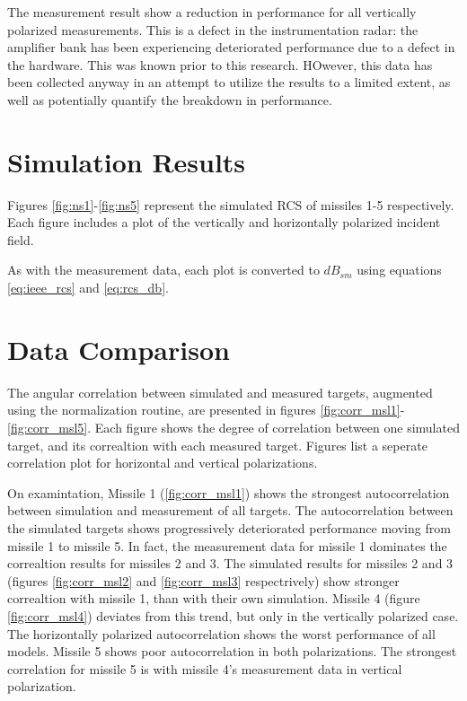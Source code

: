 	The measurement result show a reduction in performance for all vertically polarized measurements. This is a defect in the instrumentation radar:  the amplifier bank has been experiencing deteriorated performance due to a defect in the hardware. This was known prior to  this research. HOwever, this data has been collected anyway in an attempt to utilize the results to a limited extent, as well as potentially quantify the breakdown in performance.

\section{Simulation Results}
\label{sec:sim_res}

    Figures \ref{fig:ns1}-\ref{fig:ns5} represent the simulated RCS of missiles 1-5 respectively. Each figure includes a plot of the vertically and horizontally polarized incident field.

		As with the measurement data, each plot is converted to $dB_{sm}$ using equations \ref{eq:ieee_rcs} and \ref{eq:rcs_db}.

\section{Data Comparison}
\label{sec:data_comparison}

	The angular correlation between simulated and measured targets, augmented using the normalization routine, are presented in figures \ref{fig:corr_msl1}-\ref{fig:corr_msl5}. Each figure shows the degree of correlation between one simulated target, and its correaltion with each measured target. Figures list a seperate correlation plot for horizontal and vertical polarizations.

	On examintation, Missile 1 (\ref{fig:corr_msl1}) shows the strongest autocorrelation between simulation and measurement of all targets. The autocorrelation between the simulated targets shows progressively deteriorated performance moving from missile 1 to missile 5. In fact, the measurement data for missile 1 dominates the correaltion results for missiles 2 and 3. The simulated results for missiles 2 and 3 (figures \ref{fig:corr_msl2} and \ref{fig:corr_msl3} respectrively) show stronger correaltion with missile 1, than with their own simulation. Missile 4 (figure \ref{fig:corr_msl4}) deviates from this trend, but only in the vertically polarized case. The horizontally polarized autocorrelation shows the worst performance of all models. Missile 5 shows poor autocorrelation in both polarizations. The strongest correlation for missile 5 is with missile 4's measurement data in vertical polarization.

